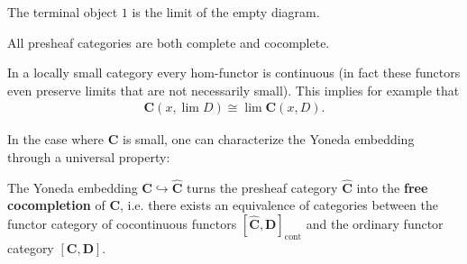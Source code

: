     \begin{example}
        The terminal object $1$ is the limit of the empty diagram.
    \end{example}

    \begin{example}\label{cat:complete_presheaf_category}
        All presheaf categories are both complete and cocomplete.
    \end{example}

    \begin{example}
        In a locally small category every hom-functor is continuous (in fact these functors even preserve limits that are not necessarily small). This implies for example that
        \begin{gather}
            \mathbf{C}(x,\lim D)\cong\lim\mathbf{C}(x, D).
        \end{gather}
    \end{example}

    In the case where $\mathbf{C}$ is small, one can characterize the Yoneda embedding through a universal property:
    \begin{uproperty}\label{cat:free_cocompletion}
        The Yoneda embedding $\mathbf{C}\hookrightarrow\widehat{\mathbf{C}}$ turns the presheaf category $\widehat{\mathbf{C}}$ into the \textbf{free cocompletion} of $\mathbf{C}$, i.e. there exists an equivalence of categories between the functor category of cocontinuous functors $[\widehat{\mathbf{C}},\mathbf{D}]_\mathrm{cont}$ and the ordinary functor category $[\mathbf{C},\mathbf{D}]$.
    \end{uproperty}

